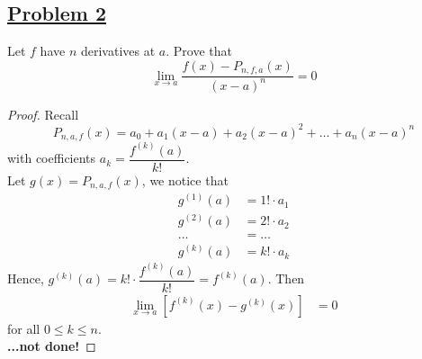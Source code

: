 \documentclass[10pt,letterpaper]{article}
\begin{document}
	\subsection*{{\color{purple}\underline{Problem 2}}}
	Let $f$ have $n$ derivatives at $a$. Prove that
	$$\displaystyle\lim_{x\to a} \dfrac{f(x) - P_{n,f,a}(x)}{(x - a)^n} = 0$$
	\begin{proof}
		Recall 
		$$P_{n,a,f}(x) = a_0 + a_1(x - a) + a_2(x - a)^2 + \ldots + a_n(x - a)^n$$
		with coefficients $a_k = \dfrac{f^{(k)}(a)}{k!}$. \\
		
		Let $g(x) = P_{n,a,f}(x)$, we notice that
	\begin{align*}
		g^{(1)}(a) &= 1! \cdot a_1  \\
		g^{(2)}(a) &= 2! \cdot a_2 \\
	    \ldots &= \ldots \\
	    g^{(k)}(a) &= k! \cdot a_k 
	\end{align*}
	Hence, $g^{(k)}(a) = k! \cdot \dfrac{f^{(k)}(a)}{k!} = f^{(k)}(a)$. Then
	\begin{align*}
	\displaystyle\lim_{x\to a}[f^{(k)}(x) - g^{(k)}(x)] &= 0 
	\end{align*}
	for all $0 \leq k \leq n$. \\
	
	\textbf{...not done!} 
	\end{proof}
	
\end{document}
